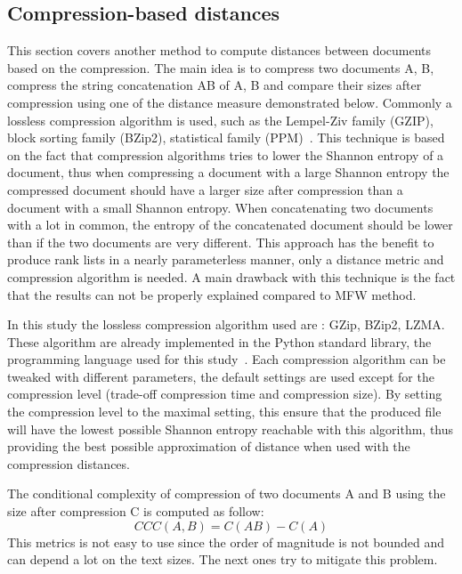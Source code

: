 \subsection{Compression-based distances \label{sec:compression_based_distances}}

This section covers another method to compute distances between documents based on the compression.
The main idea is to compress two documents A, B, compress the string concatenation AB of A, B and compare their sizes after compression using one of the distance measure demonstrated below.
Commonly a lossless compression algorithm is used, such as the Lempel-Ziv family (GZIP), block sorting family (BZip2), statistical family (PPM)~\cite{comparing_compression}.
This technique is based on the fact that compression algorithms tries to lower the Shannon entropy of a document, thus when compressing a document with a large Shannon entropy the compressed document should have a larger size after compression than a document with a small Shannon entropy.
When concatenating two documents with a lot in common, the entropy of the concatenated document should be lower than if the two documents are very different.
This approach has the benefit to produce rank lists in a nearly parameterless manner, only a distance metric and compression algorithm is needed.
A main drawback with this technique is the fact that the results can not be properly explained compared to MFW method.

In this study the lossless compression algorithm used are : GZip, BZip2, LZMA.
These algorithm are already implemented in the Python standard library, the programming language used for this study~\cite{python_standard_library}.
Each compression algorithm can be tweaked with different parameters, the default settings are used except for the compression level (trade-off compression time and compression size).
By setting the compression level to the maximal setting, this ensure that the produced file will have the lowest possible Shannon entropy reachable with this algorithm, thus providing the best possible approximation of distance when used with the compression distances.

\begin{definition}
  The conditional complexity of compression of two documents A and B using the size after compression C is computed as follow:
  \begin{equation}
    CCC(A, B) = C(AB) - C(A)
  \end{equation}
  This metrics is not easy to use since the order of magnitude is not bounded and can depend a lot on the text sizes.
  The next ones try to mitigate this problem.
\end{definition}

